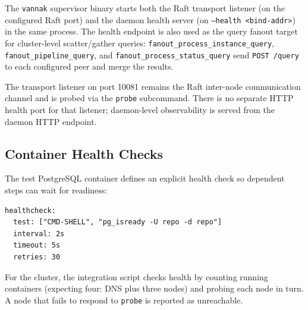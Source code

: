 The \texttt{vannak} supervisor binary starts both the Raft transport listener
(on the configured Raft port) and the daemon health server (on
\texttt{--health <bind-addr>}) in the same process. The health endpoint is
also used as the query fanout target for cluster-level scatter/gather queries:
\texttt{fanout\_process\_instance\_query}, \texttt{fanout\_pipeline\_query},
and \texttt{fanout\_process\_status\_query} send \texttt{POST /query} to each
configured peer and merge the results.

The \graft{} transport listener on port 10081 remains the Raft inter-node
communication channel and is probed via the \texttt{probe} subcommand.
There is no separate HTTP health port for that listener; daemon-level
observability is served from the daemon HTTP endpoint.

\subsection{Container Health Checks}

The test PostgreSQL container defines an explicit health check so dependent
steps can wait for readiness:

\begin{lstlisting}[numbers=none]
healthcheck:
  test: ["CMD-SHELL", "pg_isready -U repo -d repo"]
  interval: 2s
  timeout: 5s
  retries: 30
\end{lstlisting}

For the \raft{} cluster, the integration script checks health by counting
running containers (expecting four: DNS plus three nodes) and probing each node
in turn. A node that fails to respond to \texttt{probe} is reported as
unreachable.

\endinput
